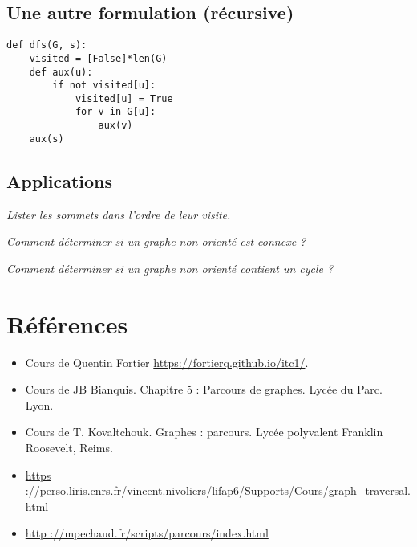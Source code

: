 \subsection{Une autre formulation (récursive)}

\begin{lstlisting}
def dfs(G, s):
    visited = [False]*len(G)
    def aux(u):
        if not visited[u]:
            visited[u] = True
            for v in G[u]:
                aux(v)
    aux(s)

\end{lstlisting}

\subsection{Applications}
\begin{exemple}
\textit{Lister les sommets dans l'ordre de leur visite.}
\end{exemple}


\begin{exemple}
\textit{Comment déterminer si un graphe non orienté est connexe ?}
\end{exemple}


\begin{exemple}
\textit{Comment déterminer si un graphe non orienté contient un cycle ?}
\end{exemple}

\section*{Références}

\begin{itemize}
\item Cours de Quentin Fortier \url{https://fortierq.github.io/itc1/}.
\item Cours de JB Bianquis. Chapitre 5 : Parcours de graphes. Lycée du Parc. Lyon.
\item Cours de T. Kovaltchouk. Graphes : parcours. Lycée polyvalent Franklin Roosevelt, Reims.
\item \url{https ://perso.liris.cnrs.fr/vincent.nivoliers/lifap6/Supports/Cours/graph_traversal.html}
\item \url{http ://mpechaud.fr/scripts/parcours/index.html}
\end{itemize}